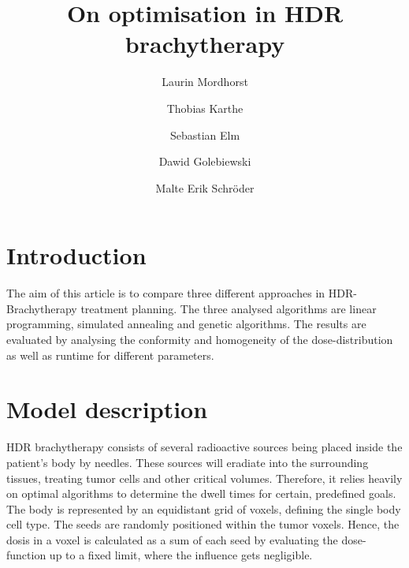 \documentclass[USenglish,twocolumn]{article}
\begin{document}

\title{On optimisation in HDR brachytherapy}
\author[1]{Laurin Mordhorst}
\author[2]{Thobias Karthe}
\author[2]{Sebastian Elm}
\author[2]{Dawid Golebiewski} 
\author[2]{Malte Erik Schröder}

	



\maketitle

\section{Introduction} 

The aim of this article is to compare three different approaches in HDR-Brachytherapy treatment planning. The three analysed algorithms are linear programming, simulated annealing and genetic algorithms. The results are evaluated by analysing the conformity and homogeneity of the dose-distribution as well as runtime for different parameters.  

\section{Model description}
HDR brachytherapy consists of several radioactive sources being placed inside the patient's body by needles. These sources will eradiate into the surrounding tissues, treating tumor cells and other critical volumes. Therefore, it relies heavily on optimal algorithms to determine the dwell times for certain, predefined goals. \\
The body is represented by an equidistant grid of voxels, defining the single body cell type. The seeds are randomly positioned within the tumor voxels. Hence, the dosis in a voxel is calculated as a sum of each seed by evaluating the dose-function up to a fixed limit, where the influence gets negligible.
\end{document}
